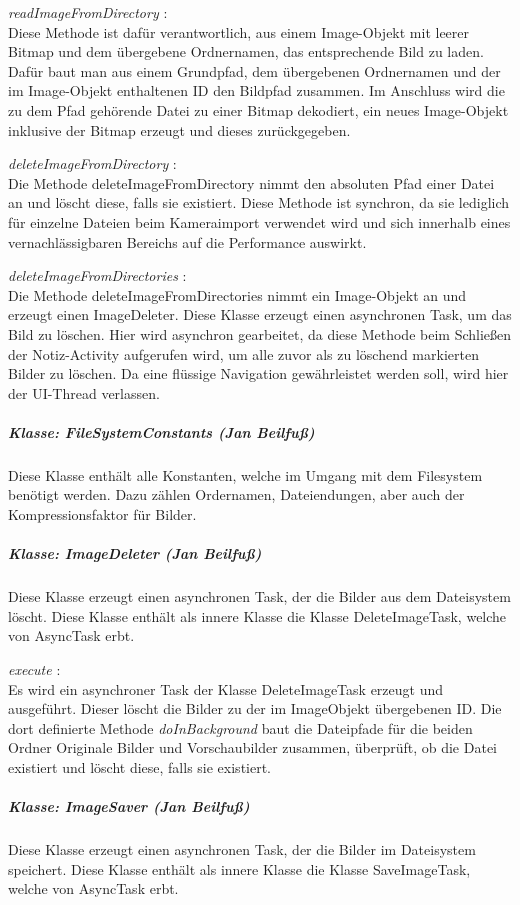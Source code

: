 \textit{ readImageFromDirectory }:\\
Diese Methode ist dafür verantwortlich, aus einem Image-Objekt mit leerer Bitmap und dem übergebene Ordnernamen, das entsprechende Bild zu laden. Dafür baut man aus einem Grundpfad, dem übergebenen Ordnernamen und der im Image-Objekt enthaltenen ID den Bildpfad zusammen. Im Anschluss wird die zu dem Pfad gehörende Datei zu einer Bitmap dekodiert, ein neues Image-Objekt inklusive der Bitmap erzeugt und dieses zurückgegeben.

\textit{ deleteImageFromDirectory }:\\
Die Methode deleteImageFromDirectory nimmt den absoluten Pfad einer Datei an und löscht diese, falls sie existiert. Diese Methode ist synchron, da sie lediglich für einzelne Dateien beim Kameraimport verwendet wird und sich innerhalb eines vernachlässigbaren Bereichs auf die Performance auswirkt.

\textit{ deleteImageFromDirectories }:\\
Die Methode deleteImageFromDirectories nimmt ein Image-Objekt an und erzeugt einen ImageDeleter. Diese Klasse erzeugt einen asynchronen Task, um das Bild zu löschen. Hier wird asynchron gearbeitet, da diese Methode beim Schließen der Notiz-Activity aufgerufen wird, um alle zuvor als zu löschend markierten Bilder zu löschen. Da eine flüssige Navigation gewährleistet werden soll, wird hier der UI-Thread verlassen.

\subparagraph{Klasse: FileSystemConstants (Jan Beilfuß)}
Diese Klasse enthält alle Konstanten, welche im Umgang mit dem Filesystem benötigt werden. Dazu zählen Ordernamen, Dateiendungen, aber auch der Kompressionsfaktor für Bilder.

\subparagraph{Klasse: ImageDeleter (Jan Beilfuß)}
Diese Klasse erzeugt einen asynchronen Task, der die Bilder aus dem Dateisystem löscht. Diese Klasse enthält als innere Klasse die Klasse DeleteImageTask, welche von AsyncTask erbt.

\textit{ execute }:\\
Es wird ein asynchroner Task der Klasse DeleteImageTask erzeugt und ausgeführt. Dieser löscht die Bilder zu der im ImageObjekt übergebenen ID. Die dort definierte Methode \textit{doInBackground} baut die Dateipfade für die beiden Ordner Originale Bilder und Vorschaubilder zusammen, überprüft, ob die Datei existiert und löscht diese, falls sie existiert.

\subparagraph{Klasse: ImageSaver (Jan Beilfuß)}
Diese Klasse erzeugt einen asynchronen Task, der die Bilder im Dateisystem speichert. Diese Klasse enthält als innere Klasse die Klasse SaveImageTask, welche von AsyncTask erbt.

